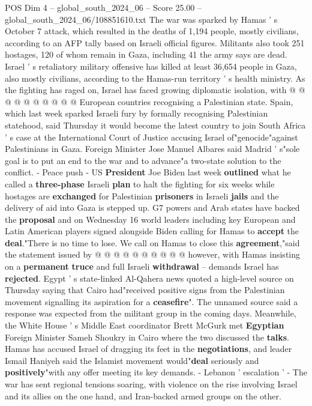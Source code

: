\begin{textsample}{POS Dim 4 – global\_south\_2024\_06 – Score 25.00 – global\_south\_2024\_06/108851610.txt}
The war was sparked by Hamas ' s October 7 attack, which resulted in the deaths of 1,194 people, mostly civilians, according to an AFP tally based on Israeli official figures.
Militants also took 251 hostages, 120 of whom remain in Gaza, including 41 the army says are dead.
Israel ' s retaliatory military offensive has killed at least 36,654 people in Gaza, also mostly civilians, according to the Hamas-run territory ' s health ministry.
As the fighting has raged on, Israel has faced growing diplomatic isolation, with @ @ @ @ @ @ @ @ @ @ European countries recognising a Palestinian state.
Spain, which last week sparked Israeli fury by formally recognising Palestinian statehood, said Thursday it would become the latest country to join South Africa ' s case at the International Court of Justice accusing Israel of"genocide"against Palestinians in Gaza.
Foreign Minister Jose Manuel Albares said Madrid ' s"sole goal is to put an end to the war and to advance"a two-state solution to the conflict. - Peace push - US \textbf{President} Joe Biden last week \textbf{outlined} what he called a \textbf{three-phase} Israeli \textbf{plan} to halt the fighting for six weeks while hostages are \textbf{exchanged} for Palestinian \textbf{prisoners} in Israeli \textbf{jails} and the delivery of aid into Gaza is stepped up.
G7 powers and Arab states have backed the \textbf{proposal} and on Wednesday 16 world leaders including key European and Latin American players signed alongside Biden calling for Hamas to \textbf{accept} the \textbf{deal}."There is no time to lose.
We call on Hamas to close this \textbf{agreement},"said the statement issued by @ @ @ @ @ @ @ @ @ @ however, with Hamas insisting on a \textbf{permanent} \textbf{truce} and full Israeli \textbf{withdrawal} -- demands Israel has \textbf{rejected}.
Egypt ' s state-linked Al-Qahera news quoted a high-level source on Thursday saying that Cairo had"received positive signs from the Palestinian movement signalling its aspiration for a \textbf{ceasefire}".
The unnamed source said a response was expected from the militant group in the coming days.
Meanwhile, the White House ' s Middle East coordinator Brett McGurk met \textbf{Egyptian} Foreign Minister Sameh Shoukry in Cairo where the two discussed the \textbf{talks}.
Hamas has accused Israel of dragging its feet in the \textbf{negotiations}, and leader Ismail Haniyeh said the Islamist movement would"\textbf{deal} seriously and \textbf{positively}"with any offer meeting its key demands. - Lebanon ' escalation ' - The war has sent regional tensions soaring, with violence on the rise involving Israel and its allies on the one hand, and Iran-backed armed groups on the other.

\end{textsample}
